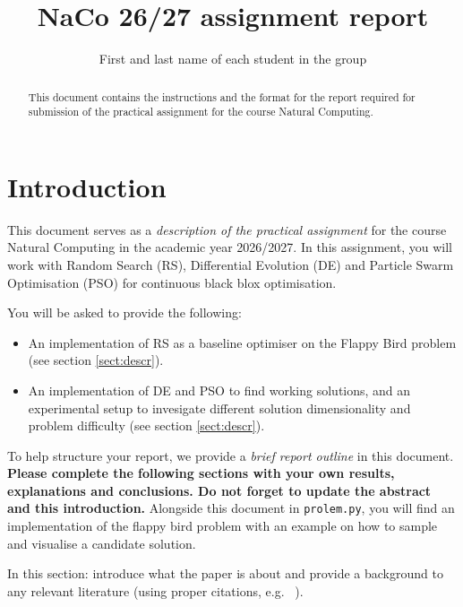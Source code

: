 \documentclass[runningheads]{llncs}
\begin{document}
%
\title{NaCo 26/27 assignment report}

\author{First and last name of each student in the group}
%

%
\maketitle %
%

\begin{abstract}
This document contains the instructions and the format for the report required for submission of the practical assignment for the course Natural Computing. 
\end{abstract}

\section{Introduction}
This document serves as a \textit{description of the practical assignment} for the course Natural Computing in the academic year 2026/2027.
In this assignment, you will work with Random Search (RS), Differential Evolution (DE) and Particle Swarm Optimisation (PSO) for continuous black blox optimisation.

You will be asked to provide the following:
\begin{itemize}
    \item An implementation of RS as a baseline optimiser on the Flappy Bird problem (see section \ref{sect:descr}).
    \item An implementation of DE and PSO to find working solutions, and an experimental setup to invesigate different solution dimensionality and problem difficulty (see section \ref{sect:descr}).
\end{itemize}

To help structure your report, we provide a \textit{brief report outline} in this document. \textbf{Please complete the following sections with your own results, explanations and conclusions. Do not forget to update the abstract and this introduction.} Alongside this document in \texttt{prolem.py}, you will find an implementation of the flappy bird problem with an example on how to sample and visualise a candidate solution.

In this section: introduce what the paper is about and provide a background to any relevant literature (using proper citations, e.g. ~\cite{towers2024gymnasiumstandardinterfacereinforcement}).
\end{document}
